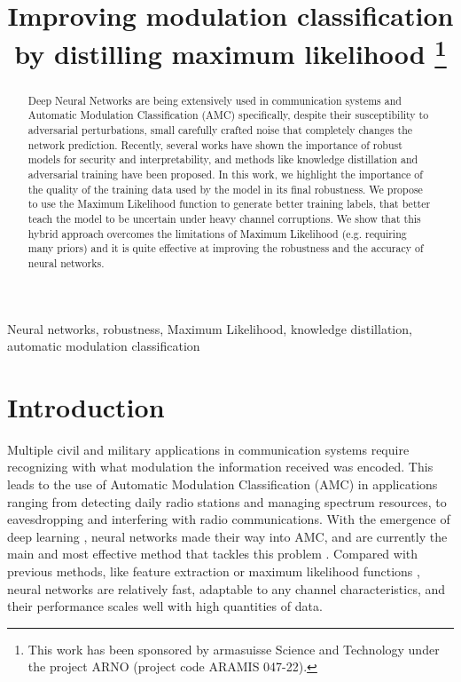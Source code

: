 \documentclass[conference]{IEEEtran}
\title{Improving modulation classification by distilling maximum likelihood
\thanks{This work has been sponsored by armasuisse Science and Technology under the project ARNO (project code ARAMIS 047-22).}
}
\author{\IEEEauthorblockN{Javier Maroto}
\IEEEauthorblockA{\textit{Signal Processing Laboratory (LTS4)} \\ \textit{EPFL, Switzerland}}
\and
\IEEEauthorblockN{Gérôme Bovet}
\IEEEauthorblockA{\textit{armasuisse Science\&Technology} \\
\textit{Cyber-Defence Campus, Switzerland}}
\and
\IEEEauthorblockN{Pascal Frossard}
\IEEEauthorblockA{\textit{Signal Processing Laboratory (LTS4)} \\ \textit{EPFL, Switzerland}}}
\begin{document}
\maketitle

\begin{abstract}
Deep Neural Networks are being extensively used in communication systems and Automatic Modulation Classification (AMC) specifically, despite their susceptibility to adversarial perturbations, small carefully crafted noise that completely changes the network prediction. Recently, several works have shown the importance of robust models for security and interpretability, and methods like knowledge distillation and adversarial training have been proposed. In this work, we highlight the importance of the quality of the training data used by the model in its final robustness. We propose to use the Maximum Likelihood function to generate better training labels, that better teach the model to be uncertain under heavy channel corruptions. We show that this hybrid approach overcomes the limitations of Maximum Likelihood (e.g. requiring many priors) and it is quite effective at improving the robustness and the accuracy of neural networks. 
\end{abstract}

\begin{IEEEkeywords}
Neural networks, robustness, Maximum Likelihood, knowledge distillation, automatic modulation classification
\end{IEEEkeywords}

\section{Introduction}

Multiple civil and military applications in communication systems require recognizing with what modulation the information received was encoded. This leads to the use of Automatic Modulation Classification (AMC) in applications ranging from detecting daily radio stations and managing spectrum resources, to eavesdropping and interfering with radio communications. With the emergence of deep learning \cite{goodfellow2016deep}, neural networks made their way into AMC, and are currently the main and most effective method that tackles this problem \cite{OShea_Roy_Clancy_2018}. Compared with previous methods, like feature extraction \cite{xie2008efficient,zhou2013design,zhang2017wireless} or maximum likelihood functions \cite{huan1995likelihood,dobre2007survey,hameed2009likelihood}, neural networks are relatively fast, adaptable to any channel characteristics, and their performance scales well with high quantities of data.
\end{document}

